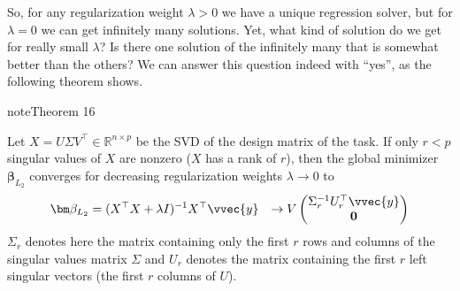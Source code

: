 \documentclass[letterpaper,10pt,english]{jupyterBook}
\begin{document}
\sphinxAtStartPar
So, for any regularization weight \(\lambda>0\) we have a unique regression solver, but for \(\lambda=0\) we can get infinitely many solutions. Yet, what kind of solution do we get for really small \(\lambda\)? Is there one solution of the infinitely many that is somewhat better than the others? We can answer this question indeed with “yes”, as the following theorem shows.
\label{regression_ridge:theorem-2}
\begin{sphinxadmonition}{note}{Theorem 16}



\sphinxAtStartPar
Let \(X=U\Sigma V^\top\in\mathbb{R}^{n\times p}\) be the SVD of the design matrix of the {\hyperref[\detokenize{regression_ridge:ridge-task}]{}} task. If only \(r<p\) singular values of \(X\) are nonzero (\(X\) has a rank of \(r\)), then the global minimizer \(\bm{\beta}_{L_2}\) converges for decreasing regularization weights \(\lambda\rightarrow 0\) to
\begin{align*}
    \bm\beta_{L_2} &= (X^\top X+\lambda I)^{-1}X^\top \vvec{y} 
    &\rightarrow V\begin{pmatrix}\Sigma_r^{-1} U_r^\top \vvec{y}\\ \mathbf{0}\end{pmatrix} 
\end{align*}
\sphinxAtStartPar
\(\Sigma_r\) denotes here the matrix containing only the first \(r\) rows and columns of the singular values matrix \(\Sigma\) and \(U_r\) denotes the matrix containing the first \(r\) left singular vectors (the first \(r\) columns of \(U\)).
\end{sphinxadmonition}
\end{document}
